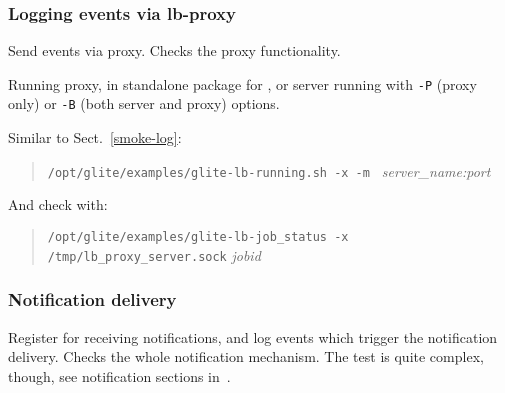 \subsubsection{Logging events via lb-proxy}

Send events via \LB proxy. Checks the proxy functionality.

\req Running \LB proxy, in standalone package for \LBold, or
\LB server running with \verb'-P' (proxy only) or \verb'-B' (both server and proxy)
options.

\how Similar to Sect.~\ref{smoke-log}:
\begin{quote}
\verb'/opt/glite/examples/glite-lb-running.sh -x -m ' \emph{server\_name:port}
\end{quote}

And check with:
\begin{quote}
\verb'/opt/glite/examples/glite-lb-job_status -x /tmp/lb_proxy_server.sock' \emph{jobid}
\end{quote}


\subsubsection{Notification delivery}

Register for receiving notifications, and log events which trigger
the notification delivery. Checks the whole notification mechanism.
The test is quite complex, though, see notification sections in~\cite{lbug,lbtp}.
